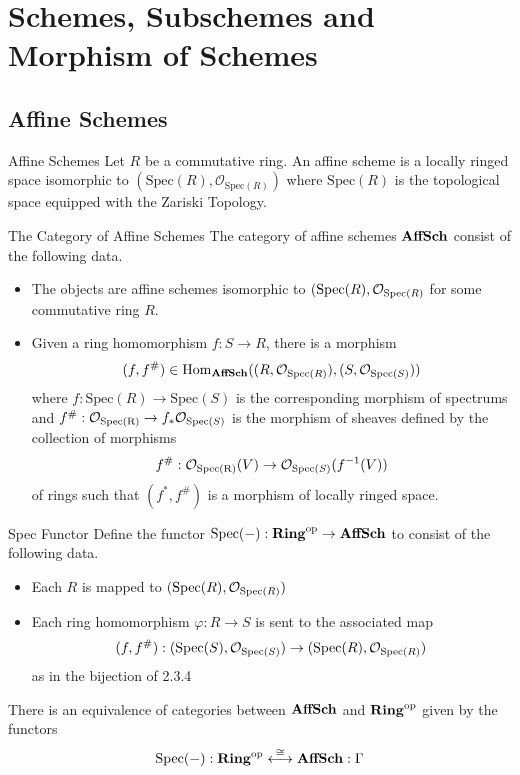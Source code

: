\documentclass[a4paper]{article}
\begin{document}
\pagebreak
\section{Schemes, Subschemes and Morphism of Schemes}
\subsection{Affine Schemes}
\begin{defn}{Affine Schemes}{} Let $R$ be a commutative ring. An affine scheme is a locally ringed space isomorphic to $(\text{Spec}(R),\mathcal{O}_{\text{Spec}(R)})$ where $\text{Spec}(R)$ is the topological space equipped with the Zariski Topology. 
\end{defn}

\begin{defn}{The Category of Affine Schemes}{} The category of affine schemes $\bold{AffSch}$ consist of the following data. 
\begin{itemize}
\item The objects are affine schemes isomorphic to $(\text{Spec}(R),\mathcal{O}_{\text{Spec}(R)}$ for some commutative ring $R$. 
\item Given a ring homomorphism $f:S\to R$, there is a morphism $$(f,f^\#)\in\operatorname{Hom}_{\bold{AffSch}}((R,\mathcal{O}_{\text{Spec}(R)}),(S,\mathcal{O}_{\text{Spec}(S)}))$$ where $f:\text{Spec}(R)\to\text{Spec}(S)$ is the corresponding morphism of spectrums and  $f^\#:\mathcal{O}_\text{Spec(R)}\to f_\ast\mathcal{O}_{\text{Spec}(S)}$ is the morphism of sheaves defined by the collection of morphisms $$f^\#:\mathcal{O}_\text{Spec(R)}(V)\to\mathcal{O}_{\text{Spec}(S)}(f^{-1}(V))$$ of rings such that $(f^\ast,f^\#)$ is a morphism of locally ringed space. 
\end{itemize}
\end{defn}

\begin{defn}{Spec Functor}{} Define the functor $\text{Spec}(-):\bold{Ring}^\text{op}\to\bold{AffSch}$ to consist of the following data. 
\begin{itemize}
\item Each $R$ is mapped to $(\text{Spec}(R),\mathcal{O}_{\text{Spec}(R)})$
\item Each ring homomorphism $\varphi:R\to S$ is sent to the associated map $$(f,f^\#):(\text{Spec}(S),\mathcal{O}_{\text{Spec}(S)})\to(\text{Spec}(R),\mathcal{O}_{\text{Spec}(R)})$$ as in the bijection of 2.3.4
\end{itemize}
\end{defn}

\begin{prp}{}{} There is an equivalence of categories between $\bold{AffSch}$ and $\bold{Ring}^{\text{op}}$ given by the functors $$\text{Spec}(-):\bold{Ring}^\text{op}\overset{\cong}{\longleftrightarrow}\bold{AffSch}:\Gamma$$
\end{prp}
\end{document}
